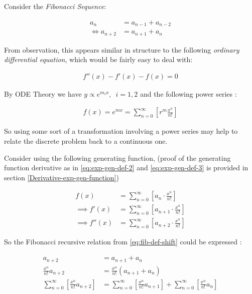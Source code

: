 \documentclass[a4paper,11pt,twoside]{article}
\begin{document}
Consider the \emph{Fibonacci Sequence}:


\begin{align}
    a_{n}&= a_{n - 1} + a_{n - 2} \nonumber \\
\iff a_{n+  2} &= a_{n+  1} +  a_n \label{eq:fib-def-shift}
\end{align}

From observation, this appears similar in structure to the following \emph{ordinary
differential equation}, which would be fairly easy to deal with:


\begin{align*}
f''\left( x \right)- f'\left( x \right)- f\left( x \right)=  0
\end{align*}

By ODE Theory we have \(y \propto e^{m_{i}x}, \enspace i = 1, 2\) \cite[\S 4.1.2]{zillDifferentialEquationsBoundaryvalue2009}
and the following power series \cite[\S 64]{churchillComplexVariablesApplications2014}:

\begin{align*}
f\left( x \right)= e^{mx} = \sum^{\infty}_{n= 0}   \left[ r^{m} \frac{x^n}{n!} \right]
\end{align*}

So using some sort of a transformation involving a power series may help to
relate the discrete problem back to a continuous one.

Consider using the following generating function, (proof of the
generating function derivative as in \eqref{eq:exp-gen-def-2} and \eqref{eq:exp-gen-def-3} is
provided in section \ref{Derivative-exp-gen-function})




\begin{align}
    f\left( x \right) &=  \sum^{\infty}_{n= 0}   \left[ a_{n} \cdot  \frac{x^n}{n!} \right]   \label{eq:exp-gen-def-1} \\
 \implies   f'\left( x \right) &=  \sum^{\infty}_{n= 0}   \left[ a_{n+1} \cdot  \frac{x^n}{n!} \right]   \label{eq:exp-gen-def-2} \\
\implies    f''\left( x \right) &=  \sum^{\infty}_{n= 0}   \left[ a_{n+2} \cdot  \frac{x^n}{n!} \right]   \label{eq:exp-gen-def-3}
\end{align}


So the Fibonacci recursive relation from \eqref{eq:fib-def-shift}  could be expressed :


\begin{align*}
a_{n+  2}    &= a_{n+  1} +  a_{n}\\
\frac{x^n}{n!}   a_{n+  2}    &= \frac{x^n}{n!}\left( a_{n+  1} +  a_{n}  \right)\\
\sum^{\infty}_{n= 0} \left[ \frac{x^n}{n!}   a_{n+  2} \right]        &= \sum^{\infty}_{n= 0}   \left[ \frac{x^n}{n!} a_{n+  1} \right]  + \sum^{\infty}_{n= 0}   \left[ \frac{x^n}{n!} a_{n}  \right]  \\
\end{align*}
\end{document}
